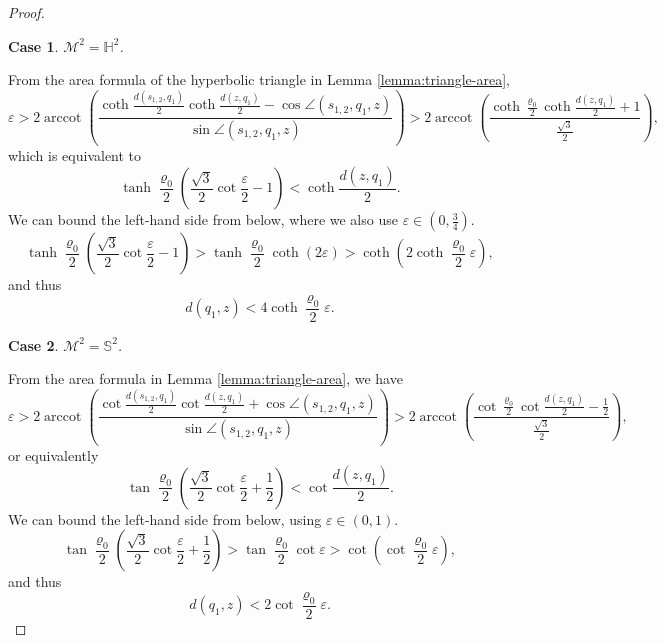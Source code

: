 \documentclass[10pt,a4paper]{amsart}
\newtheorem{case}{Case}
\newcommand{\M}{\mathcal{M}}
\DeclareMathOperator{\arccot}{\mathrm{arccot}}
\newcommand{\hyp}{{\mathbb H}}
\newcommand{\sph}{{\mathbb S}}
\begin{document}
\begin{proof}
\begin{case}
    $\M^2=\hyp^2$.
\end{case}

From the area formula of the hyperbolic triangle in Lemma \ref{lemma:triangle-area},
\[
\varepsilon>2\arccot\left(\frac{\coth\frac{d(s_{1,2},q_1)}{2}\coth\frac{d(z,q_1)}{2}-\cos\angle(s_{1,2},q_1,z)}{\sin\angle(s_{1,2},q_1,z)}\right)>2\arccot\left(\frac{\coth\frac{\varrho_0}{2}\coth\frac{d(z,q_1)}{2}+1}{\frac{\sqrt{3}}{2}}\right),
\]
which is equivalent to
\[
\tanh\frac{\varrho_0}{2}\left(\frac{\sqrt{3}}{2}\cot\frac{\varepsilon}{2}-1\right)<\coth\frac{d(z,q_1)}{2}.
\]
We can bound the left-hand side from below, where we also use $\varepsilon\in\left(0,\frac{3}{4}\right)$.
\[
\tanh\frac{\varrho_0}{2}\left(\frac{\sqrt{3}}{2}\cot\frac{\varepsilon}{2}-1\right)>\tanh\frac{\varrho_0}{2}\coth(2\varepsilon)>\coth\left(2\coth\frac{\varrho_0}{2}\varepsilon\right),
\]
and thus
\[
d(q_1,z)<4\coth\frac{\varrho_0}{2}\varepsilon.
\]

\begin{case}
    $\M^2=\sph^2$.
\end{case}

From the area formula in Lemma \ref{lemma:triangle-area}, we have
\[
\varepsilon>2\arccot\left(\frac{\cot\frac{d(s_{1,2},q_1)}{2}\cot\frac{d(z,q_1)}{2}+\cos\angle(s_{1,2},q_1,z)}{\sin\angle(s_{1,2},q_1,z)}\right)>2\arccot\left(\frac{\cot\frac{\varrho_0}{2}\cot\frac{d(z,q_1)}{2}-\frac{1}{2}}{\frac{\sqrt{3}}{2}}\right),
\]
or equivalently
\[
\tan\frac{\varrho_0}{2}\left(\frac{\sqrt{3}}{2}\cot\frac{\varepsilon}{2}+\frac{1}{2}\right)<\cot\frac{d(z,q_1)}{2}.
\]
We can bound the left-hand side from below, using $\varepsilon\in(0,1)$.
\[
\tan\frac{\varrho_0}{2}\left(\frac{\sqrt{3}}{2}\cot\frac{\varepsilon}{2}+\frac{1}{2}\right)>\tan\frac{\varrho_0}{2}\cot\varepsilon>\cot\left(\cot\frac{\varrho_0}{2}\varepsilon\right),
\]
and thus
\[
d(q_1,z)<2\cot\frac{\varrho_0}{2}\varepsilon.
\]
\end{proof}
\end{document}
